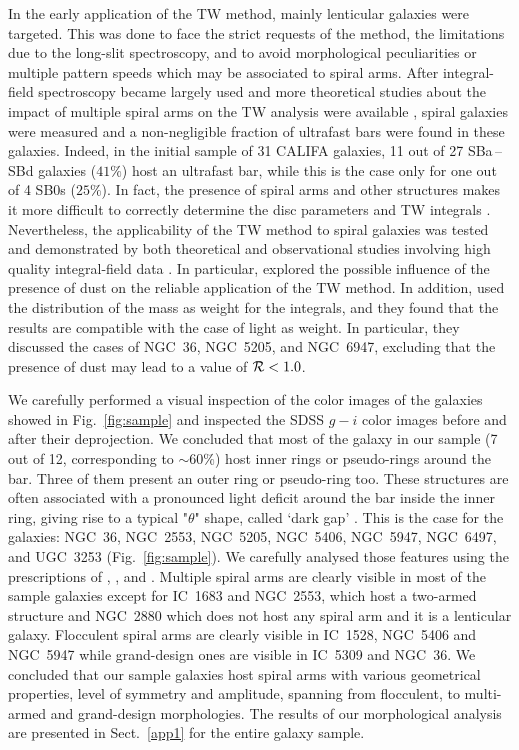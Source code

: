 \documentclass{aa}
\begin{document}
In the early application of the TW method, mainly lenticular galaxies were targeted. This was done to face the strict requests of the method, the limitations due to the long-slit spectroscopy, and to avoid morphological peculiarities or multiple pattern speeds which may be associated to spiral arms. After integral-field spectroscopy became largely used and more theoretical studies about the impact of multiple spiral arms on the TW analysis were available \citep{Debattista2002,Meidt2008}, spiral galaxies were measured and a non-negligible fraction of ultrafast bars were found in these galaxies. Indeed, in the initial sample of 31 CALIFA galaxies, 11 out of 27 SBa\,--\,SBd galaxies ($41\%$) host an ultrafast bar, while this is the case only for one out of 4 SB0s ($25\%$). In fact, the presence of spiral arms and other structures makes it more difficult to correctly determine the disc parameters and TW integrals \citep{Corsini2011,Cuomo2020}. Nevertheless, the applicability of the TW method to spiral galaxies was tested and demonstrated by both theoretical \citep{gerssen2007,Zou2019} and observational studies involving high quality integral-field data \citep{Aguerri2015,Guo2019,Garma-Oehmichen2020, Williams2021}. In particular, \citet{gerssen2007} explored the possible influence of the presence of dust on the reliable application of the TW method. In addition, \citet{Aguerri2015} used the distribution of the mass as weight for the integrals, and they found that the results are compatible with the case of light as weight. In particular, they discussed the cases of NGC~36, NGC~5205, and NGC~6947, excluding that the presence of dust may lead to a value of ${\cal R}<1.0$. 

We carefully performed a visual inspection of the color images of the galaxies showed in Fig.~\ref{fig:sample} and inspected the SDSS $g-i$ color images before and after their deprojection. We concluded that most of the galaxy in our sample (7 out of 12, corresponding to $\sim60\%$) host inner rings or pseudo-rings around the bar. Three of them present an outer ring or pseudo-ring too. These structures are often associated with a pronounced light deficit around the bar inside the inner ring, giving rise to a typical "$\theta$" shape, called `dark gap' \citep{Kim2016,James2016,Buta2017}. This is the case for the galaxies: NGC~36, NGC~2553, NGC~5205, NGC~5406, NGC~5947, NGC~6497, and UGC~3253 (Fig.~\ref{fig:sample}). We carefully analysed those features using the prescriptions of \citet{Buta2015}, \citet{Buta2017}, and \citet{Bittner2020}. Multiple spiral arms are clearly visible in most of the sample galaxies except for IC~1683 and NGC~2553, which host a two-armed structure and NGC~2880 which does not host any spiral arm and it is a lenticular galaxy. Flocculent spiral arms are clearly visible in IC~1528, NGC~5406 and NGC~5947 while grand-design ones are visible in IC~5309 and NGC~36. We concluded that our sample galaxies host spiral arms with various geometrical properties, level of symmetry and amplitude, spanning from flocculent, to multi-armed and grand-design morphologies. The results of our morphological analysis are presented in Sect.~\ref{app1} for the entire galaxy sample.
\end{document}
